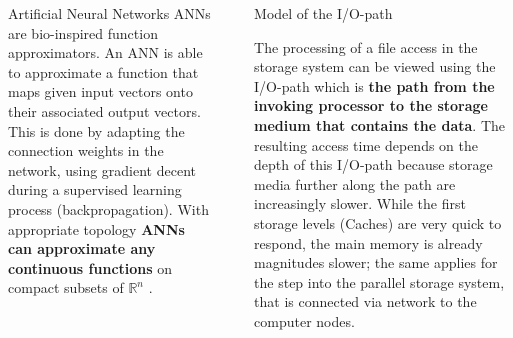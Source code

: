 \documentclass[final]{beamer}
\newlength{\sepwid}
\newlength{\onecolwid}
\begin{document}
\begin{frame}[t]
\begin{columns}[t]
\begin{column}{\onecolwid}
\begin{block}{Artificial Neural Networks}
	ANNs are bio-inspired function approximators.
	An ANN is able to approximate a function that maps given input vectors onto their associated output vectors.
	This is done by adapting the connection weights in the network, using gradient decent during a supervised learning process (backpropagation).
	With appropriate topology \textbf{ANNs can approximate any continuous functions} on compact subsets of $\mathbb{R}^n$ \cite{cybenko:mcss}.
	
	
\end{block}

\end{column} %

\begin{column}{\sepwid}\end{column} %

\begin{column}{\onecolwid} %
	

\begin{block}{Model of the I/O-path}
	
	The processing of a file access in the storage system can be viewed using the I/O-path which is \textbf{the path from the invoking processor to the storage medium that contains the data}.
	The resulting access time depends on the depth of this I/O-path because storage media further along the path are increasingly slower.
	While the first storage levels (Caches) are very quick to respond, the main memory is already magnitudes slower; the same applies for the step into the parallel storage system, that is connected via network to the computer nodes. %
		
	



\end{block}
\end{column}
\end{columns}
\end{frame}
\end{document}
